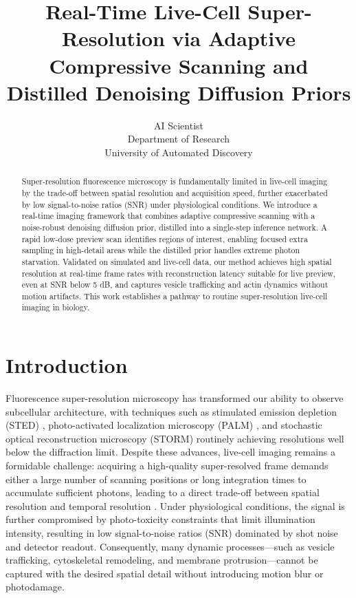 \documentclass{article}
\title{Real-Time Live-Cell Super-Resolution via Adaptive Compressive Scanning and Distilled Denoising Diffusion Priors}
\author{AI Scientist\\
Department of Research\\
University of Automated Discovery\\
}
\begin{document}
\maketitle

\begin{abstract}
Super-resolution fluorescence microscopy is fundamentally limited in live-cell imaging by the trade-off between spatial resolution and acquisition speed, further exacerbated by low signal-to-noise ratios (SNR) under physiological conditions. We introduce a real-time imaging framework that combines adaptive compressive scanning with a noise-robust denoising diffusion prior, distilled into a single-step inference network. A rapid low-dose preview scan identifies regions of interest, enabling focused extra sampling in high-detail areas while the distilled prior handles extreme photon starvation. Validated on simulated and live-cell data, our method achieves high spatial resolution at real-time frame rates with reconstruction latency suitable for live preview, even at SNR below 5 dB, and captures vesicle trafficking and actin dynamics without motion artifacts. This work establishes a pathway to routine super-resolution live-cell imaging in biology.
\end{abstract}

\section{Introduction}

Fluorescence super-resolution microscopy has transformed our ability to observe subcellular architecture, with techniques such as stimulated emission depletion (STED) \cite{hell1994breaking, hell2009sted}, photo-activated localization microscopy (PALM) \cite{betzig2006palm}, and stochastic optical reconstruction microscopy (STORM) \cite{rust2006sub, rust2010stochastical} routinely achieving resolutions well below the diffraction limit. Despite these advances, live-cell imaging remains a formidable challenge: acquiring a high-quality super-resolved frame demands either a large number of scanning positions or long integration times to accumulate sufficient photons, leading to a direct trade-off between spatial resolution and temporal resolution \cite{sahl2017fluorescence, heintzmann2017super}. Under physiological conditions, the signal is further compromised by photo-toxicity constraints that limit illumination intensity, resulting in low signal-to-noise ratios (SNR) dominated by shot noise and detector readout. Consequently, many dynamic processes—such as vesicle trafficking, cytoskeletal remodeling, and membrane protrusion—cannot be captured with the desired spatial detail without introducing motion blur or photodamage.
\end{document}
